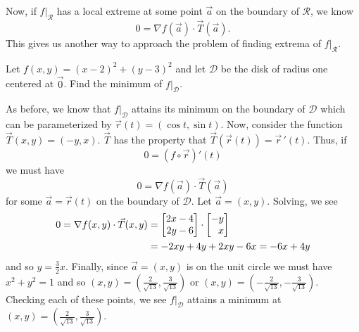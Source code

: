 \begin{center}
\end{center}


Now, if $f\big|_{\mathcal R}$ has a local extreme at some point $\vec a$ on the
boundary of $\mathcal R$, we know
\[
	0=\nabla f(\vec a)\cdot \vec T(\vec a).
\]
This gives us another way to approach the problem of finding extrema of $f\big|_{\mathcal R}$.

\begin{example}
	Let $f(x,y)=(x-2)^2+(y-3)^2$
	and let $\mathcal D$ be the disk of radius one centered at $\vec 0$.  Find
	the minimum of $f\big|_{\mathcal D}$.  

	As before, we know that $f\big|_{\mathcal D}$ attains its minimum on the boundary
	of $\mathcal D$ which can be parameterized by $\vec r(t)=(\cos t,\sin t)$.  
	Now, consider the function $\vec T(x,y)=(-y,x)$.  
	$\vec T$ has the property that $\vec T(\vec r(t))=\vec r\,'(t)$.  Thus, if
	\[
		0=(f\circ \vec r)'(t)
	\]
	we must have
	\[
		0=\nabla f(\vec a)\cdot \vec T(\vec a)
	\]
	for some $\vec a=\vec r(t)$ on the boundary of $\mathcal D$.  Let $\vec a=(x,y)$.
	Solving, we see
	\begin{align*}
		0=\nabla f(x,y)\cdot \vec T(x,y)&=\mat{2x-4\\2y-6}\cdot \mat{-y\\x}\\
		&=-2xy+4y+2xy-6x=-6x+4y
	\end{align*}
	and so $y=\tfrac{3}{2}x$.  Finally, since $\vec a=(x,y)$ is on the unit circle
	we must have $x^2+y^2=1$ and so $(x,y)=(\tfrac{2}{\sqrt{13}},
	\tfrac{3}{\sqrt{13}})$ or $(x,y)=(-\tfrac{2}{\sqrt{13}},
	-\tfrac{3}{\sqrt{13}})$.  Checking each of these points, we see $f\big|_{\mathcal D}$
	attains a minimum at $(x,y)=(\tfrac{2}{\sqrt{13}},
	\tfrac{3}{\sqrt{13}})$.
\end{example}

